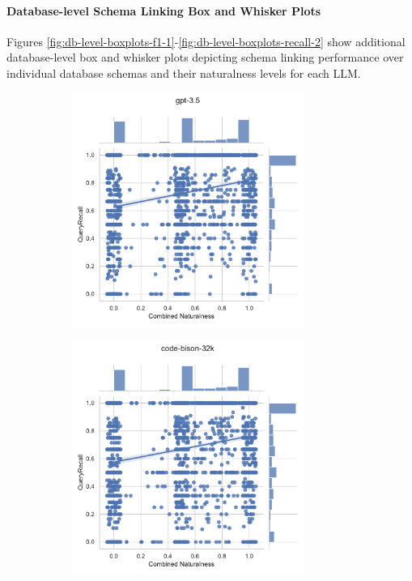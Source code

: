 \paragraph{Database-level Schema Linking Box and Whisker Plots}

Figures \ref{fig:db-level-boxplots-f1-1}-\ref{fig:db-level-boxplots-recall-2} show additional database-level box and whisker plots depicting schema linking performance over individual database schemas and their naturalness levels for each LLM.

% 
\begin{figure}
    \centering
    \begin{subfigure}{.5\textwidth}
      \centering
      \includegraphics[height=3in]{figures/distribution-jointplots/jointplot-gpt-3.5-combined-nat--recall-with-distributions.pdf}
    \end{subfigure}%
    \begin{subfigure}{.5\textwidth}
      \centering
      \includegraphics[height=3in]{figures/distribution-jointplots/jointplot-code-bison-32k-combined-nat--recall-with-distributions.pdf}
    \end{subfigure}

\end{figure}
